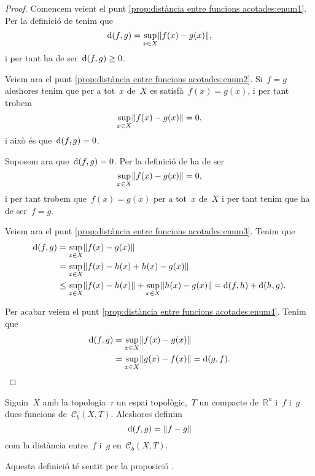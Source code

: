 \documentclass[../../main.tex]{subfiles}
\begin{document}
    \begin{proof}
        Comencem veient el punt \eqref{prop:distància entre funcions acotades:enum1}.
        Per la definició de  tenim que
        \[
            \distancia(f,g)=\sup_{x\in X}\norm{f(x)-g(x)},
        \]
        i per tant ha de ser~\(\operatorname{d}(f,g)\geq0\).

        Veiem ara el punt \eqref{prop:distància entre funcions acotades:enum2}.
        Si~\(f=g\) aleshores tenim que per a tot~\(x\) de~\(X\) es satisfà~\(f(x)=g(x)\), i per tant trobem
        \[
            \sup_{x\in X}\norm{f(x)-g(x)}=0,
        \]
        i això és que~\(\operatorname{d}(f,g)=0\).

        Suposem ara que~\(\operatorname{d}(f,g)=0\).
        Per la definició de  ha de ser
        \[
            \sup_{x\in X}\norm{f(x)-g(x)}=0,
        \]
        i per tant trobem que~\(f(x)=g(x)\) per a tot~\(x\) de~\(X\) i per tant tenim que ha de ser~\(f=g\).

        Veiem ara el punt \eqref{prop:distància entre funcions acotades:enum3}.
        Tenim que
        \begin{align*}
            \distancia(f,g)&=\sup_{x\in X}\norm{f(x)-g(x)} \\
            &=\sup_{x\in X}\norm{f(x)-h(x)+h(x)-g(x)} \\
            &\leq\sup_{x\in X}\norm{f(x)-h(x)}+\sup_{x\in X}\norm{h(x)-g(x)}=\distancia(f,h)+\distancia(h,g).
        \end{align*}

        Per acabar veiem el punt \eqref{prop:distància entre funcions acotades:enum4}.
        Tenim que
        \begin{align*}
            \distancia(f,g)&=\sup_{x\in X}\norm{f(x)-g(x)} \\
            &=\sup_{x\in X}\norm{g(x)-f(x)}=\distancia(g,f).\qedhere
        \end{align*}
    \end{proof}
    \begin{definition}
        \label{def:distància entre funcions acotades}
        Siguin~\(X\) amb la topologia~\(\tau\) un espai topològic,~\(T\) un compacte de~\(\mathbb{R}^{n}\) i~\(f\) i~\(g\) dues funcions de~\(\mathcal{C}_{b}(X,T)\).
        Aleshores definim
        \[
            \distancia(f,g)=\norm{f-g}
        \]
        com la distància entre~\(f\) i~\(g\) en~\(\mathcal{C}_{b}(X,T)\).

        Aquesta definició té sentit per la proposició .
    \end{definition}
\end{document}

